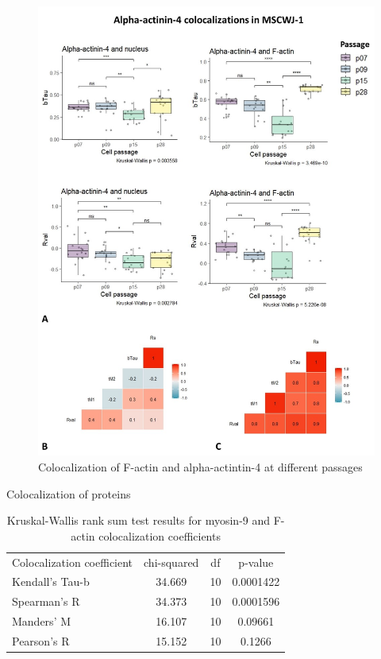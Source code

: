 \documentclass[english,authoryear]{elsarticle}
\begin{document}
\begin{figure}[hbt!]
\centering
\includegraphics[width=0.9\linewidth]{fig_a4-actin-col.jpg}
\caption{Colocalization of F-actin and alpha-actintin-4 at different passages}
\label{a4-actin-col}
\end{figure}

Colocalization of proteins


\begin{table}
  \caption{Kruskal-Wallis rank sum test results for myosin-9 and F-actin colocalization coefficients}
  \label{tab1}
\centering
\begin{tabular}{l|ccc}
 Colocalization coefficient & chi-squared & df & p-value  \\
 Kendall's Tau-b & 34.669 & 10 & 0.0001422 \\
 Spearman's R & 34.373 & 10 &  0.0001596 \\
 Manders' M & 16.107 & 10 & 0.09661 \\
 Pearson's R & 15.152 & 10 & 0.1266

\end{tabular}
\end{table}
\end{document}
